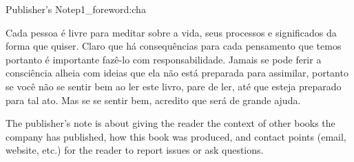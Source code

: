 

\begin{chapterpage}{Publisher's Note}{p1_foreword:cha}

\begin{myquotation}
Cada pessoa é livre para meditar sobre a vida, seus processos e significados da forma que quiser. Claro que há consequências para cada pensamento que temos portanto é importante fazê-lo com responsabilidade. Jamais se pode ferir a consciência alheia com ideias que ela não está preparada para assimilar, portanto se você não se sentir bem ao ler este livro, pare de ler, até que esteja preparado para tal ato. Mas se se sentir bem, acredito que será de grande ajuda.\end{myquotation}

\end{chapterpage}

The publisher's note is about giving the reader the context of other books the company has published, how this book was produced, and contact points (email, website, etc.) for the reader to report issues or ask questions.

\hfil{}\hfil
